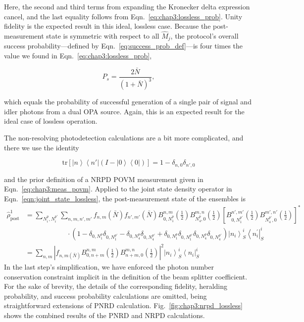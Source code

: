 \documentclass[aps,twocolumn,secnumarabic,amsmath,amssymb,pra,groupedaddress,
showpacs, showkeys]{revtex4-1}
\newcommand{\bra}[1]{\left\langle #1 \right|}
\newcommand{\ket}[1]{\left|#1\right\rangle}
\newcommand{\pna}[1]{\left(#1\right)}
\newcommand{\pnb}[1]{\left[#1\right]}
\newcommand{\eqn}[1]{
\begin{equation}
	#1
\end{equation}
}
\newcommand{\abs}[1]{\left|#1\right|}
\begin{document}
Here, the second and third terms from expanding the Kronecker delta expression
cancel, and the last equality follows from
Eqn.~\ref{eq:chap3:lossless_prob}. Unity fidelity is the expected result in
this ideal, lossless case. Because the post-measurement state is symmetric with
respect to all $\hat{M}_j$, the protocol's overall success
probability---defined by Eqn.~\ref{eq:success_prob_def}---is four times the
value we found in Eqn.~\ref{eq:chap3:lossless_prob},
\eqn{
P_{s}= \frac{2\bar{N}}{\pna{1+\bar{N}}^3},
}
which equals the probability of successful generation of a single pair of
signal and idler photons from a dual OPA source. Again, this is an expected
result for the ideal case of lossless operation. 

The non-resolving photodetection calculations are a bit more complicated, and
there we use the identity
\eqn{
\textrm{tr}\pnb{\ket{n}\bra{n'}\pna{I-\ket{0}\bra{0}}}=1-\delta_{n,0}\delta_{n',0}
}
and the prior definition of a NRPD POVM measurement given in
Eqn.~\ref{eq:chap3:meas_povm}. Applied to the joint state density operator in
Eqn.~\ref{eqn:joint_state_lossless}, the post-measurement state of the
ensembles is
\begin{align}
\hat{\rho}_{\textrm{post}}^{1}& =\sum_{N_i^p, N_i^{p\prime}}\sum_{n,m,n',m'} f_{n,m}\pna{\bar{N}}f_{n',m'}\pna{\bar{N}} B_{0,N_1^p}^{n,m}\pna{\frac{1}{2}}  
B_{N_4^p,0}^{m,n}\pna{\frac{1}{2}}\pnb{B_{0,N_1^{p\prime}}^{n',m'}\pna{\frac{1}{2}}  
B_{N_4^{p\prime},0}^{m',n'}\pna{\frac{1}{2}}}^* \nonumber \\
& \qquad\qquad\qquad\cdot  \pna{1-\delta_{0,N_1^{p}}\delta_{0,N_1^{p\prime}} - \delta_{0,N_4^{p}}\delta_{0,N_4^{p\prime}} + \delta_{0,N_1^{p}}\delta_{0,N_1^{p\prime}} \delta_{0,N_4^{p}}\delta_{0,N_4^{p\prime}}}\ket{n_i}^i_S\bra{n_i^{\prime}}^i_S \nonumber \\
& = \sum_{n,m} \abs{f_{n,m\pna{\bar{N}}} B_{0,n+m}^{n,m}\pna{\frac{1}{2}} B_{n+m,0}^{m,n}\pna{\frac{1}{2} }}^2 \ket{n_i}^i_S\bra{n_i}^i_S
\end{align}
In the last step's simplification, we have enforced the photon number
conservation constraint implicit in the definition of the beam splitter
coefficient. For the sake of brevity, the details of the corresponding
fidelity, heralding probability, and success probability calculations are
omitted, being straightforward extensions of PNRD
calculation. Fig.~\ref{fig:chap3:nrpd_lossless} shows the combined results of
the PNRD and NRPD calculations.
\end{document}
